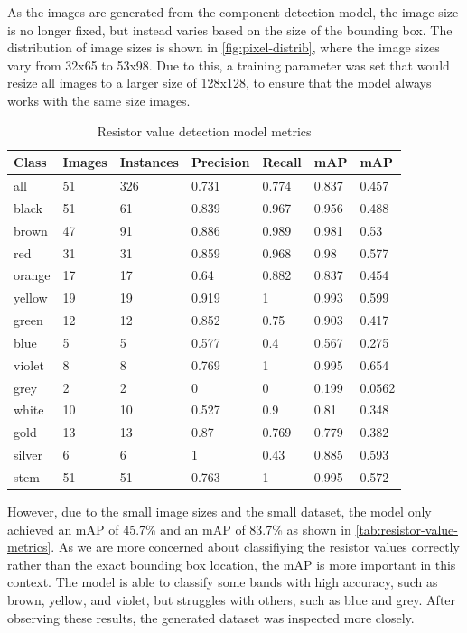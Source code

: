 As the images are generated from the component detection model, the image size is no longer fixed, but instead varies based on the size of the bounding box. The distribution of image sizes is shown in \autoref{fig:pixel-distrib}, where the image sizes vary from 32x65 to 53x98. Due to this, a training parameter was set that would resize all images to a larger size of 128x128, to ensure that the model always works with the same size images.
\begin{table}[H]
  \centering
  \begin{tabularx}{\textwidth}{|X|X|X|X|X|X|X|}
    \hline
    \textbf{Class} & \textbf{Images} & \textbf{Instances} & \textbf{Precision} & \textbf{Recall} & \textbf{mAP\raisebox{-1pt}{\textsuperscript{50}}} & \textbf{mAP\raisebox{-1pt}{\textsuperscript{50-95}}}\\
    \hline
    all & 51 & 326 & 0.731 & 0.774 & 0.837 & 0.457\\
    \hline
    black & 51 & 61 & 0.839 & 0.967 & 0.956 & 0.488\\
    \hline
    brown & 47 & 91 & 0.886 & 0.989 & 0.981 & 0.53\\
    \hline
    red & 31 & 31 & 0.859 & 0.968 & 0.98 & 0.577\\
    \hline
    orange & 17 & 17 & 0.64 & 0.882 & 0.837 & 0.454\\
    \hline
    yellow & 19 & 19 & 0.919 & 1 & 0.993 & 0.599\\
    \hline
    green & 12 & 12 & 0.852 & 0.75 & 0.903 & 0.417\\
    \hline
    blue & 5 & 5 & 0.577 & 0.4 & 0.567 & 0.275\\
    \hline
    violet & 8 & 8 & 0.769 & 1 & 0.995 & 0.654\\
    \hline
    grey & 2 & 2 & 0 & 0 & 0.199 & 0.0562\\
    \hline
    white & 10 & 10 & 0.527 & 0.9 & 0.81 & 0.348\\
    \hline
    gold & 13 & 13 & 0.87 & 0.769 & 0.779 & 0.382\\
    \hline
    silver & 6 & 6 & 1 & 0.43 & 0.885 & 0.593\\
    \hline
    stem & 51 & 51 & 0.763 & 1 & 0.995 & 0.572\\
    \hline

  \end{tabularx}
  \caption{Resistor value detection model metrics}
  \label{tab:resistor-value-metrics}
\end{table}


However, due to the small image sizes and the small dataset, the model only achieved an mAP of 45.7\% and an mAP of 83.7\% as shown in \autoref{tab:resistor-value-metrics}. As we are more concerned about classifiying the resistor values correctly rather than the exact bounding box location, the mAP is more important in this context. The model is able to classify some bands with high accuracy, such as brown, yellow, and violet, but struggles with others, such as blue and grey. After observing these results, the generated dataset was inspected more closely.

